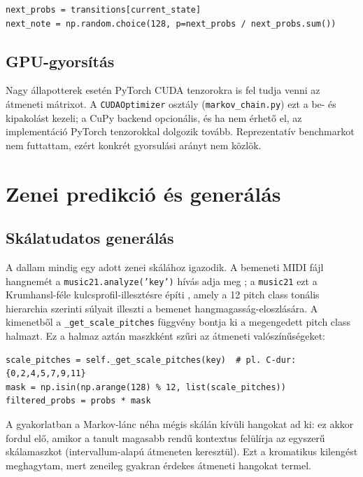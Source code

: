 \begin{lstlisting}
next_probs = transitions[current_state]
next_note = np.random.choice(128, p=next_probs / next_probs.sum())
\end{lstlisting}

\subsection{GPU-gyorsítás}

Nagy állapotterek esetén PyTorch CUDA tenzorokra is fel tudja venni az átmeneti mátrixot. A \texttt{CUDAOptimizer} osztály (\texttt{markov\_chain.py}) ezt a be- és kipakolást kezeli; a CuPy backend opcionális, és ha nem érhető el, az implementáció PyTorch tenzorokkal dolgozik tovább. Reprezentatív benchmarkot nem futtattam, ezért konkrét gyorsulási arányt nem közlök.

\section{Zenei predikció és generálás}

\subsection{Skálatudatos generálás}

A dallam mindig egy adott zenei skálához igazodik. A bemeneti MIDI fájl hangnemét a \texttt{music21.analyze('key')} hívás adja meg \cite{music21}; a \texttt{music21} ezt a Krumhansl-féle kulcsprofil-illesztésre építi \cite{krumhansl1990cognitive}, amely a 12 pitch class tonális hierarchia szerinti súlyait illeszti a bemenet hangmagasság-eloszlására. A kimenetből a \texttt{\_get\_scale\_pitches} függvény bontja ki a megengedett pitch class halmazt. Ez a halmaz aztán maszkként szűri az átmeneti valószínűségeket:

\begin{lstlisting}
scale_pitches = self._get_scale_pitches(key)  # pl. C-dur: {0,2,4,5,7,9,11}
mask = np.isin(np.arange(128) % 12, list(scale_pitches))
filtered_probs = probs * mask
\end{lstlisting}

A gyakorlatban a Markov-lánc néha mégis skálán kívüli hangokat ad ki: ez akkor fordul elő, amikor a tanult magasabb rendű kontextus felülírja az egyszerű skálamaszkot (intervallum-alapú átmeneten keresztül). Ezt a kromatikus kilengést meghagytam, mert zeneileg gyakran érdekes átmeneti hangokat termel.

